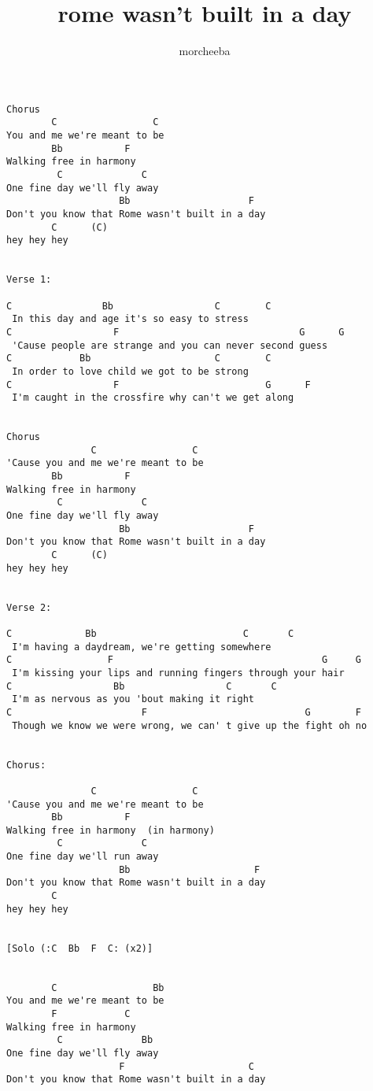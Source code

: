 \author{morcheeba}
\title{rome wasn't built in a day}
\maketitle
\begin{verbatim}
Chorus
        C                 C
You and me we're meant to be
        Bb           F
Walking free in harmony
         C              C
One fine day we'll fly away
                    Bb                     F
Don't you know that Rome wasn't built in a day
        C      (C)
hey hey hey


Verse 1:

C                Bb                  C        C
 In this day and age it's so easy to stress
C                  F                                G      G
 'Cause people are strange and you can never second guess
C            Bb                      C        C
 In order to love child we got to be strong
C                  F                          G      F
 I'm caught in the crossfire why can't we get along


Chorus
               C                 C
'Cause you and me we're meant to be
        Bb           F
Walking free in harmony
         C              C
One fine day we'll fly away
                    Bb                     F
Don't you know that Rome wasn't built in a day
        C      (C)
hey hey hey


Verse 2:

C             Bb                          C       C
 I'm having a daydream, we're getting somewhere
C                 F                                     G     G
 I'm kissing your lips and running fingers through your hair
C                  Bb                  C       C
 I'm as nervous as you 'bout making it right
C                       F                            G        F
 Though we know we were wrong, we can' t give up the fight oh no 
   

Chorus:

               C                 C
'Cause you and me we're meant to be
        Bb           F
Walking free in harmony  (in harmony)
         C              C
One fine day we'll run away
                    Bb                      F
Don't you know that Rome wasn't built in a day
        C
hey hey hey


[Solo (:C  Bb  F  C: (x2)]


        C                 Bb
You and me we're meant to be
        F            C
Walking free in harmony
         C              Bb
One fine day we'll fly away
                    F                      C
Don't you know that Rome wasn't built in a day


\end{verbatim}

